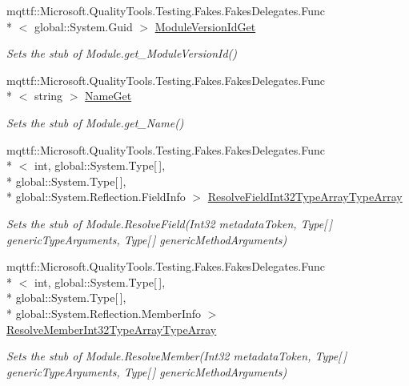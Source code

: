 \begin{DoxyCompactItemize}
mqttf\-::\-Microsoft.\-Quality\-Tools.\-Testing.\-Fakes.\-Fakes\-Delegates.\-Func\\*
$<$ global\-::\-System.\-Guid $>$ \hyperlink{class_system_1_1_reflection_1_1_fakes_1_1_stub_module_ab362a0ffc71693bd38cd51f8ecd8545d}{Module\-Version\-Id\-Get}
\begin{DoxyCompactList}\small\item\em Sets the stub of Module.\-get\-\_\-\-Module\-Version\-Id()\end{DoxyCompactList}\item 
mqttf\-::\-Microsoft.\-Quality\-Tools.\-Testing.\-Fakes.\-Fakes\-Delegates.\-Func\\*
$<$ string $>$ \hyperlink{class_system_1_1_reflection_1_1_fakes_1_1_stub_module_a8a18d696e2697c176d984fcd8c7e3a46}{Name\-Get}
\begin{DoxyCompactList}\small\item\em Sets the stub of Module.\-get\-\_\-\-Name()\end{DoxyCompactList}\item 
mqttf\-::\-Microsoft.\-Quality\-Tools.\-Testing.\-Fakes.\-Fakes\-Delegates.\-Func\\*
$<$ int, global\-::\-System.\-Type\mbox{[}$\,$\mbox{]}, \\*
global\-::\-System.\-Type\mbox{[}$\,$\mbox{]}, \\*
global\-::\-System.\-Reflection.\-Field\-Info $>$ \hyperlink{class_system_1_1_reflection_1_1_fakes_1_1_stub_module_a60f0908f1a6df1a9af7cf5537d894dee}{Resolve\-Field\-Int32\-Type\-Array\-Type\-Array}
\begin{DoxyCompactList}\small\item\em Sets the stub of Module.\-Resolve\-Field(\-Int32 metadata\-Token, Type\mbox{[}$\,$\mbox{]} generic\-Type\-Arguments, Type\mbox{[}$\,$\mbox{]} generic\-Method\-Arguments)\end{DoxyCompactList}\item 
mqttf\-::\-Microsoft.\-Quality\-Tools.\-Testing.\-Fakes.\-Fakes\-Delegates.\-Func\\*
$<$ int, global\-::\-System.\-Type\mbox{[}$\,$\mbox{]}, \\*
global\-::\-System.\-Type\mbox{[}$\,$\mbox{]}, \\*
global\-::\-System.\-Reflection.\-Member\-Info $>$ \hyperlink{class_system_1_1_reflection_1_1_fakes_1_1_stub_module_af03721565d1455036f9c2df2f6bedc06}{Resolve\-Member\-Int32\-Type\-Array\-Type\-Array}
\begin{DoxyCompactList}\small\item\em Sets the stub of Module.\-Resolve\-Member(\-Int32 metadata\-Token, Type\mbox{[}$\,$\mbox{]} generic\-Type\-Arguments, Type\mbox{[}$\,$\mbox{]} generic\-Method\-Arguments)\end{DoxyCompactList}\item 

\end{DoxyCompactItemize}
